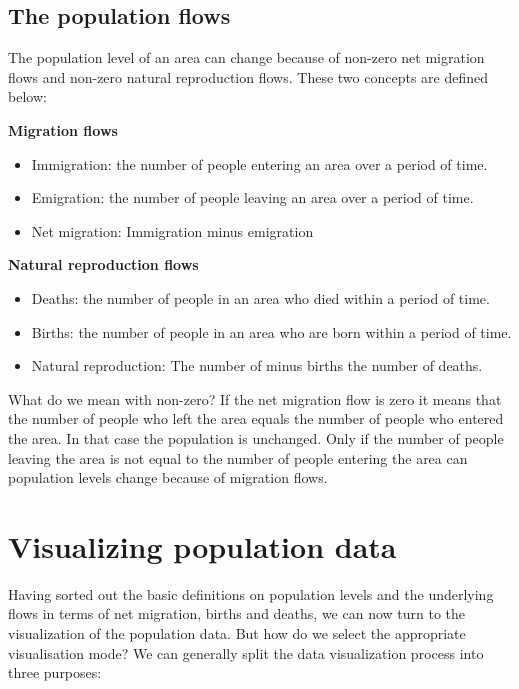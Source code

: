 \documentclass[]{book}
\providecommand{\tightlist}{%
  \setlength{\itemsep}{0pt}\setlength{\parskip}{0pt}}
\newenvironment{myblock}%
{%
 \begin{tcolorbox}%
}%
{\end{tcolorbox}}%
\begin{document}
\hypertarget{the-population-flows}{%
\subsection{The population flows}\label{the-population-flows}}

The population level of an area can change because of non-zero net migration flows and non-zero natural reproduction flows. These two concepts are defined below:

\begin{myblock}
\textbf{Migration flows}

\begin{itemize}
\tightlist
\item
  Immigration: the number of people entering an area over a period of
  time.
\item
  Emigration: the number of people leaving an area over a period of
  time.
\item
  Net migration: Immigration minus emigration
\end{itemize}
\end{myblock}

\begin{myblock}
\textbf{Natural reproduction flows}

\begin{itemize}
\tightlist
\item
  Deaths: the number of people in an area who died within a period of
  time.
\item
  Births: the number of people in an area who are born within a period
  of time.
\item
  Natural reproduction: The number of minus births the number of deaths.
\end{itemize}
\end{myblock}

What do we mean with non-zero? If the net migration flow is zero it means that the number of people who left the area equals the number of people who entered the area. In that case the population is unchanged. Only if the number of people leaving the area is not equal to the number of people entering the area can population levels change because of migration flows.

\hypertarget{people:vis}{%
\section{Visualizing population data}\label{people:vis}}

Having sorted out the basic definitions on population levels and the underlying flows in terms of net migration, births and deaths, we can now turn to the visualization of the population data. But how do we select the appropriate visualisation mode? We can generally split the data visualization process into three purposes:
\end{document}
